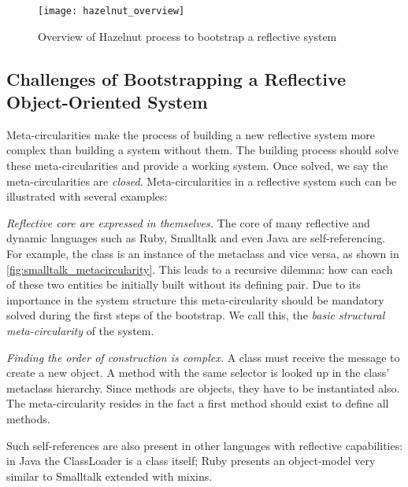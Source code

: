 \begin{figure}[!ht]
\begin{center}
\texttt{[image: hazelnut\_overview]}
\caption{Overview of Hazelnut process to bootstrap a reflective system\label{fig:hazelnut_overview}}
\end{center}
\end{figure}

\subsection{Challenges of Bootstrapping a Reflective Object-Oriented System}

Meta-circularities make the process of building a new reflective system more complex than building a system without them. 
The building process should solve these meta-circularities and provide a working system.
Once solved, we say the meta-circularities are \emph{closed}.
Meta-circularities in a reflective system such can be illustrated with several examples:

\begin{description}
\item \emph{Reflective core are expressed in themselves.} The core of many reflective and dynamic languages such as 
Ruby, Smalltalk and even Java are self-referencing. For example, the  class is an instance of the  metaclass and vice versa, as shown in \autoref{fig:smalltalk_metacircularity}.
This leads to a recursive dilemma: how can each of these two entities be initially built without its defining pair.
Due to its importance in the system structure this meta-circularity should be mandatory solved during the first steps of the bootstrap. We call this, the \emph{basic structural meta-circularity} of the system.

\item \emph{Finding the order of construction is complex.} A class must receive the  message to create a new object.
A method with the same selector is looked up in the class' metaclass hierarchy.
Since methods are objects, they have to be instantiated also.
The meta-circularity resides in the fact a first  method should exist to define all methods.
\end{description}

Such self-references are also present in other languages with reflective capabilities: \eg in Java the ClassLoader is a class itself;
Ruby presents an object-model very similar to Smalltalk extended with mixins.

